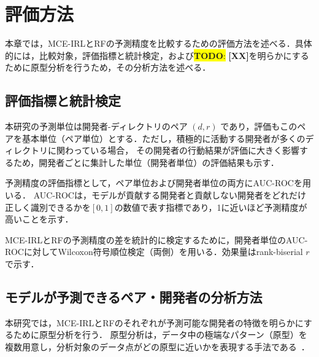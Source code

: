 \documentclass[submit,noauthor,ses,dvipdfmx]{ipsj}
\newcommand{\todo}[1]{\colorbox{yellow}{{\bf TODO}:}{\color{red} {\textbf{[#1]}}}}
\begin{document}
\section{評価方法}\label{sec:evaluation}

本章では，MCE-IRLとRFの予測精度を比較するための評価方法を述べる．具体的には，比較対象，評価指標と統計検定，および\todo{XX}を明らかにするために原型分析を行うため，その分析方法を述べる．

\subsection{評価指標と統計検定}

本研究の予測単位は開発者-ディレクトリのペア $(d, r)$ であり，評価もこのペアを基本単位（ペア単位）とする．ただし，積極的に活動する開発者が多くのディレクトリに関わっている場合，
その開発者の行動結果が評価に大きく影響するため，開発者ごとに集計した単位（開発者単位）の評価結果も示す．

予測精度の評価指標として，ペア単位および開発者単位の両方にAUC-ROCを用いる．
AUC-ROCは，モデルが貢献する開発者と貢献しない開発者をどれだけ正しく識別できるかを$[0, 1]$の数値で表す指標であり，1に近いほど予測精度が高いことを示す．

MCE-IRLとRFの予測精度の差を統計的に検定するために，開発者単位のAUC-ROCに対してWilcoxon符号順位検定（両側）を用いる．効果量はrank-biserial $r$ で示す．






\subsection{モデルが予測できるペア・開発者の分析方法}

本研究では，MCE-IRLとRFのそれぞれが予測可能な開発者の特徴を明らかにするために原型分析を行う．
原型分析は，データ中の極端なパターン（原型）を複数用意し，分析対象のデータ点がどの原型に近いかを表現する手法である~\cite{cutler_breiman}．
\end{document}
